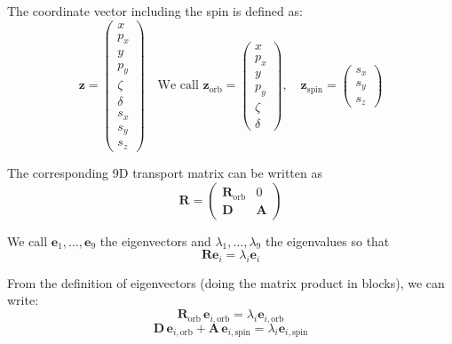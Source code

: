 The coordinate vector including the spin is defined as:
\begin{equation}
\bm{z} =
\begin{pmatrix}
x \\
p_x \\
y \\
p_y \\
\zeta \\
\delta \\
s_x \\
s_y \\
s_z
\end{pmatrix}
\quad \text{We call }
\bm{z}_{\text{orb}} =
\begin{pmatrix}
x \\
p_x \\
y \\
p_y \\
\zeta \\
\delta
\end{pmatrix},
\quad
\bm{z}_{\text{spin}} =
\begin{pmatrix}
s_x \\
s_y \\
s_z
\end{pmatrix}
\end{equation}

The corresponding 9D transport matrix can be written as
\begin{equation}
\mathbf{R} =
\begin{pmatrix}
\mathbf{R}_{\text{orb}} & 0 \\
\mathbf{D} & \mathbf{A}
\end{pmatrix}
\end{equation}

We call $\bm{e}_1, \ldots, \bm{e}_9$ the eigenvectors and $\lambda_1, \ldots, \lambda_9$ the eigenvalues so that
\begin{equation}
\mathbf{R} \bm{e}_i = \lambda_i \bm{e}_i
\end{equation}

From the definition of eigenvectors (doing the matrix product in blocks), we can write:
\begin{equation}
\mathbf{R}_{\text{orb}} \, \bm{e}_{i, \text{orb}} = \lambda_i \bm{e}_{i, \text{orb}}
\label{eq:eispin_from_eiorb}
\end{equation}
\begin{equation}
\mathbf{D} \, \bm{e}_{i, \text{orb}} + \mathbf{A} \, \bm{e}_{i, \text{spin}} = \lambda_i \bm{e}_{i, \text{spin}}
\end{equation}

